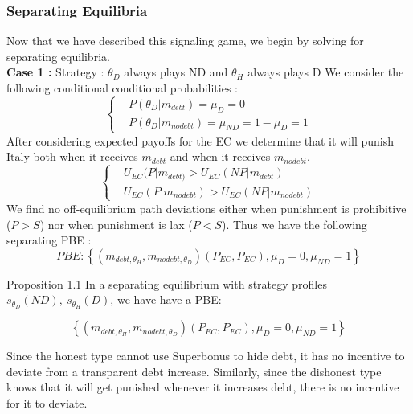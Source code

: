 \documentclass{article}
\begin{document}
\subsubsection{Separating Equilibria}
Now that we have described this signaling game, we begin by solving for separating equilibria.\\
\indent \textbf{Case 1 : } 
Strategy : $\theta_D$ always plays ND and $\theta_H$ always plays D
We consider the following conditional conditional probabilities : 
\begin{equation}
\left\{
\begin{aligned}
    &P(\theta_D|m_{debt}) = \mu_D = 0 \\
    &P(\theta_D|m_{nodebt})= \mu_{ND}=1-\mu_D=1
\end{aligned}
\right.
\end{equation}
After considering expected payoffs for the EC we determine that it will punish Italy both when it receives $m_{debt}$ and when it receives $m_{nodebt}$. 
\begin{equation}
\left\{
\begin{aligned}
    &U_{EC}(P|m_{debt)}>U_{EC}(NP|m_{debt}) \\
    &U_{EC}(P|m_{nodebt}) > U_{EC}(NP|m_{nodebt})
\end{aligned}
\right.
\end{equation}
We find no off-equilibrium path deviations either when punishment is prohibitive ($P>S$) nor when punishment is lax ($P<S$).
Thus we have the following separating PBE : $$PBE :\left\{(m_{debt,\theta_H}, m_{nodebt,\theta_D})(P_{EC},P_{EC}),\mu_D=0,\mu_{ND}=1 \right\}$$

\begin{simplebox}{Proposition 1.1}
In a separating equilibrium with strategy profiles
\( s_{\theta_D}(ND),\ s_{\theta_H}(D) \), we have have a PBE: 

$$\left\{(m_{debt,\theta_H}, m_{nodebt,\theta_D})(P_{EC},P_{EC}),\mu_D=0,\mu_{ND}=1 \right\}$$
\end{simplebox}

Since the honest type cannot use Superbonus to hide debt, it has no incentive to deviate from a transparent debt increase. Similarly, since the dishonest type knows that it will get punished whenever it increases debt, there is no incentive for it to deviate. 
\end{document}

